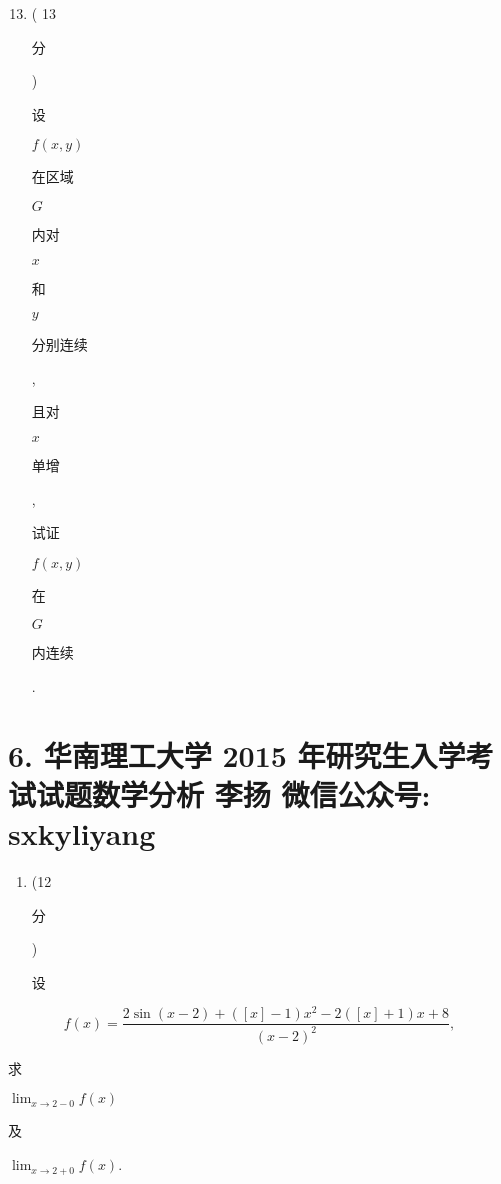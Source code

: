 \documentclass[10pt]{article}
\begin{document}
\begin{enumerate}
  \setcounter{enumi}{12}
  \item ( 13 \begin{CJK}{UTF8}{mj}分\end{CJK}) \begin{CJK}{UTF8}{mj}设\end{CJK} $f(x, y)$ \begin{CJK}{UTF8}{mj}在区域\end{CJK} $G$ \begin{CJK}{UTF8}{mj}内对\end{CJK} $x$ \begin{CJK}{UTF8}{mj}和\end{CJK} $y$ \begin{CJK}{UTF8}{mj}分别连续\end{CJK}, \begin{CJK}{UTF8}{mj}且对\end{CJK} $x$ \begin{CJK}{UTF8}{mj}单增\end{CJK}, \begin{CJK}{UTF8}{mj}试证\end{CJK} $f(x, y)$ \begin{CJK}{UTF8}{mj}在\end{CJK} $G$ \begin{CJK}{UTF8}{mj}内连续\end{CJK}.
\end{enumerate}
\section{6. 华南理工大学 2015 年研究生入学考试试题数学分析 
 李扬 
 微信公众号: sxkyliyang}
\begin{enumerate}
  \item (12 \begin{CJK}{UTF8}{mj}分\end{CJK}) \begin{CJK}{UTF8}{mj}设\end{CJK}
\end{enumerate}
$$
f(x)=\frac{2 \sin (x-2)+([x]-1) x^{2}-2([x]+1) x+8}{(x-2)^{2}},
$$
\begin{CJK}{UTF8}{mj}求\end{CJK} $\lim _{x \rightarrow 2-0} f(x)$ \begin{CJK}{UTF8}{mj}及\end{CJK} $\lim _{x \rightarrow 2+0} f(x)$.
\end{document}
